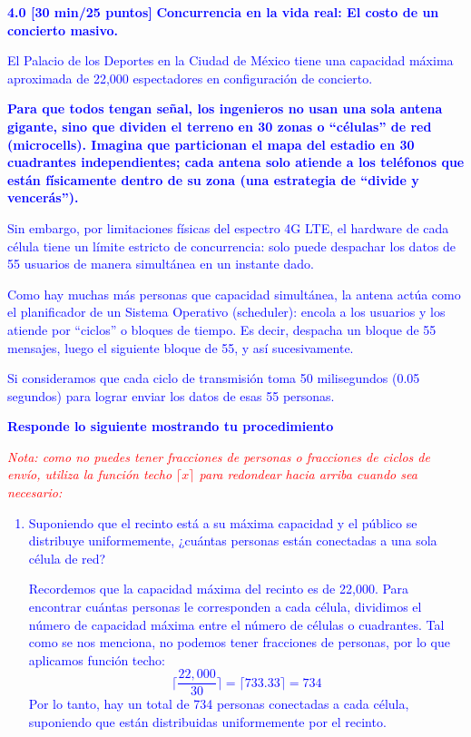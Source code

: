 \textcolor{blue}{\textbf{4.0 [30 min/25 puntos]}
    \textbf{Concurrencia en la vida real: El costo de un concierto masivo.}}

    \textcolor{blue}{El Palacio de los Deportes en la Ciudad de México tiene una
    capacidad máxima aproximada de 22,000 espectadores en configuración
    de concierto.}

    \textcolor{blue}{\textbf{Para que todos tengan señal, los ingenieros no usan una sola antena
    gigante, sino que dividen el terreno en 30 zonas o ``células'' de red
    (microcells). Imagina que particionan el mapa del estadio en 30
    cuadrantes independientes; cada antena solo atiende a los teléfonos
    que están físicamente dentro de su zona (una estrategia de
    ``divide y vencerás'').}

    \textcolor{blue}{Sin embargo, por limitaciones físicas del espectro 4G LTE, el hardware de cada célula tiene un límite estricto de concurrencia: solo puede
    despachar los datos de 55 usuarios de manera simultánea en un instante
    dado.}

    \textcolor{blue}{Como hay muchas más personas que capacidad simultánea, la antena actúa
    como el planificador de un Sistema Operativo (scheduler): encola a los
    usuarios y los atiende por ``ciclos'' o bloques de tiempo. Es decir,
    despacha un bloque de 55 mensajes, luego el siguiente bloque de 55,
    y así sucesivamente.}

    \textcolor{blue}{Si consideramos que cada ciclo de transmisión toma 50 milisegundos
    (0.05 segundos) para lograr enviar los datos de esas 55 personas.}

    \vspace{0.3cm}

    \textcolor{blue}{\textbf{Responde lo siguiente mostrando tu procedimiento}}

    \noindent
    \textcolor{red}{\textit{Nota: como no puedes tener fracciones de personas o fracciones
    de ciclos de envío, utiliza la función techo $\lceil x\rceil$ para
    redondear hacia arriba cuando sea necesario:}}

    \begin{enumerate}

        \item \textcolor{azul}{Suponiendo que el recinto está a su máxima capacidad y el
        público se distribuye uniformemente, ¿cuántas personas están
        conectadas a una sola célula de red?}

        Recordemos que la capacidad máxima del recinto es de 22,000. Para encontrar cuántas personas le corresponden a cada célula, dividimos el número de capacidad máxima entre el número de células o cuadrantes. Tal como se nos menciona, no podemos tener fracciones de personas, por lo que aplicamos función techo:
        \begin{equation*}
            \lceil \frac{22,000}{30} \rceil = \lceil 733.33 \rceil = 734
        \end{equation*}
        Por lo tanto, hay un total de 734 personas conectadas a cada célula, suponiendo que están distribuidas uniformemente por el recinto.
        

\end{enumerate}}
